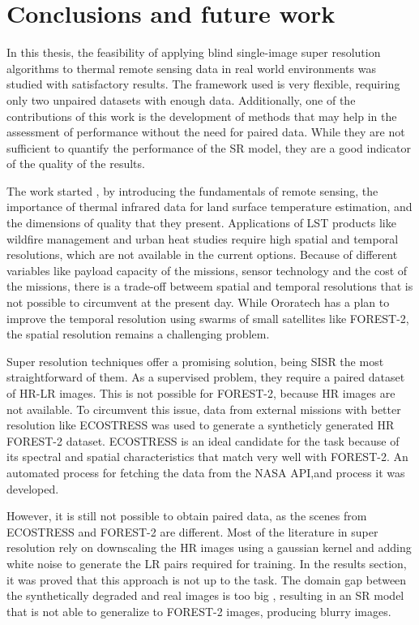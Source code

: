 \section{Conclusions and future work}

In this thesis, the feasibility of applying blind single-image super resolution algorithms to thermal remote sensing data in real world environments was studied with satisfactory results. The framework used is very flexible, requiring only two unpaired datasets with enough data. Additionally, one of the contributions of this work is the development of methods that may help in the assessment of performance without the need for paired data. While they are not sufficient to quantify the performance of the SR model, they are a good indicator of the quality of the results.

The work started , by introducing the fundamentals of remote sensing, the importance of thermal infrared data for land surface temperature estimation, and the dimensions of quality that they present.
Applications of LST products like wildfire management and urban heat studies require high spatial and temporal resolutions, which are not available in the current options. 
Because of different variables like payload capacity of the missions, sensor technology and the cost of the missions, there is a trade-off betweem spatial and temporal resolutions that is not possible to circumvent at the present day.
While Ororatech has a plan to improve the temporal resolution using swarms of small satellites like FOREST-2, the spatial resolution remains a challenging problem.

Super resolution techniques offer a promising solution, being SISR the most straightforward of them. As a supervised problem, they require a paired dataset of HR-LR images. This is not possible for FOREST-2, because HR images are not available.
To circumvent this issue, data from external missions with better resolution like ECOSTRESS was used to generate a syntheticly generated HR FOREST-2 dataset. ECOSTRESS is an ideal candidate for the task because of its spectral and spatial characteristics that match very well with FOREST-2.
An automated process for fetching the data from the NASA API,and process it was developed.

However, it is still not possible to obtain paired data, as the scenes from ECOSTRESS and FOREST-2 are different. Most of the literature in super resolution rely on downscaling the HR images using a gaussian kernel and adding white noise to generate the LR pairs required for training. 
In the results section, it was proved that this approach is not up to the task. The domain gap between the synthetically degraded and real images is too big , resulting in an SR model that is not able to generalize to FOREST-2 images, producing blurry images.

